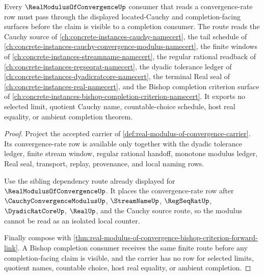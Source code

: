 \begin{theorem}
\label{thm:real-modulus-of-convergence-located-cauchy-route}
Every $\RealModulusOfConvergenceUp$ consumer that reads a convergence-rate row must pass through the displayed located-Cauchy and completion-facing surfaces before the claim is visible to a completion consumer. The route reads the Cauchy source of \autoref{ch:concrete-instances-cauchy-namecert}, the tail schedule of \autoref{ch:concrete-instances-cauchy-convergence-modulus-namecert}, the finite windows of \autoref{ch:concrete-instances-streamname-namecert}, the regular rational readback of \autoref{ch:concrete-instances-regseqrat-namecert}, the dyadic tolerance ledger of \autoref{ch:concrete-instances-dyadicratcore-namecert}, the terminal Real seal of \autoref{ch:concrete-instances-real-namecert}, and the Bishop completion criterion surface of \autoref{ch:concrete-instances-bishop-completion-criterion-namecert}. It exports no selected limit, quotient Cauchy name, countable-choice schedule, host real equality, or ambient completion theorem.
\end{theorem}
\begin{proof}
Project the accepted carrier of \autoref{def:real-modulus-of-convergence-carrier}. Its convergence-rate row is available only together with the dyadic tolerance ledger, finite stream window, regular rational handoff, monotone modulus ledger, Real seal, transport, replay, provenance, and local naming rows.

Use the sibling dependency route already displayed for $\RealModulusOfConvergenceUp$. It places the convergence-rate row after $\CauchyConvergenceModulusUp$, $\StreamNameUp$, $\RegSeqRatUp$, $\DyadicRatCoreUp$, $\RealUp$, and the Cauchy source route, so the modulus cannot be read as an isolated local counter.

Finally compose with \autoref{thm:real-modulus-of-convergence-bishop-criterion-forward-link}. A Bishop completion consumer receives the same finite route before any completion-facing claim is visible, and the carrier has no row for selected limits, quotient names, countable choice, host real equality, or ambient completion.
\end{proof}
